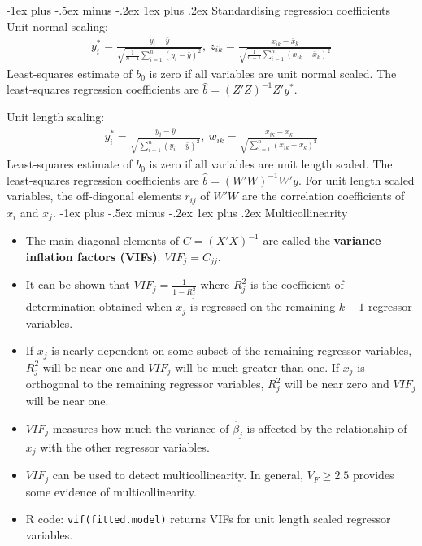 \documentclass[frenchspacing,9pt,landscape,a4paper]{article}
\makeatletter
\renewcommand{\subsubsection}{\@startsection{subsubsection}{3}{0mm}%
                                {-1ex plus -.5ex minus -.2ex}%
                                {1ex plus .2ex}%
                                {\normalfont\small\bfseries}}
\makeatother
\begin{document}
\begin{multicols}{3}
\subsubsection{Standardising regression coefficients}
Unit normal scaling:
\begin{align*}
	y_i^*=\frac{y_i-\bar{y}}{\sqrt{\frac{1}{n-1}\sum_{i=1}^n(y_i-\bar{y})^2}},\ z_{ik}=\frac{x_{ik}-\bar{x}_k}{\sqrt{\frac{1}{n-1}\sum_{i=1}^n(x_{ik}-\bar{x}_k)^2}}
\end{align*}
Least-squares estimate of $b_0$ is zero if all variables are unit normal scaled. The least-squares regression coefficients are $\hat{b}=(Z'Z)^{-1}Z'y^*$.

Unit length scaling:
\begin{align*}
	y_i^*=\frac{y_i-\bar{y}}{\sqrt{\sum_{i=1}^n(y_i-\bar{y})^2}},\ w_{ik}=\frac{x_{ik}-\bar{x}_k}{\sqrt{\sum_{i=1}^n(x_{ik}-\bar{x}_k)^2}}
\end{align*}
Least-squares estimate of $b_0$ is zero if all variables are unit length scaled. The least-squares regression coefficients are $\hat{b}=(W'W)^{-1}W'y$. For unit length scaled variables, the off-diagonal elements $r_{ij}$ of $W'W$ are the correlation coefficients of $x_i$ and  $x_j$.
\subsubsection{Multicollinearity}
\begin{itemize}
	\item The main diagonal elements of $C=(X'X)^{-1}$ are called the \textbf{variance inflation factors (VIFs)}. $VIF_j=C_{jj}$.
	\item It can be shown that $VIF_j=\frac{1}{1-R_j^2}$ where $R_j^2$ is the coefficient of determination obtained when  $x_j$ is regressed on the remaining  $k-1$ regressor variables.
	\item If  $x_j$ is nearly dependent on some subset of the remaining regressor variables,  $R_j^2$ will be near one and  $VIF_j$ will be much greater than one. If  $x_j$ is orthogonal to the remaining regressor variables,  $R_j^2$ will be near zero and  $VIF_j$ will be near one.
	\item  $VIF_j$ measures how much the variance of  $\hat{\beta}_j$ is affected by the relationship of  $x_j$ with the other regressor variables.
	\item  $VIF_j$ can be used to detect multicollinearity. In general,  $V_F\geq 2.5$ provides some evidence of multicollinearity.
	\item R code: \texttt{vif(fitted.model)} returns VIFs for unit length scaled regressor variables.
\end{itemize}

\end{multicols}
\end{document}
